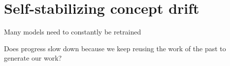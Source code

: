 \setchapterpreamble[u]{\margintoc}
\chapter{Self-stabilizing concept drift}

Many models need to constantly be retrained

Does progress slow down because we keep reusing the work of the past to generate our work?

